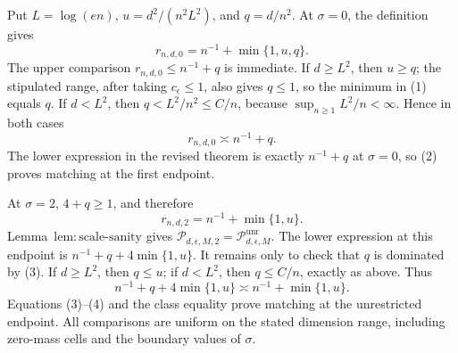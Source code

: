 Put \(L=\log(en)\), \(u=d^2/(n^2L^2)\), and \(q=d/n^2\).  At \(\sigma=0\), the definition gives
\[
 r_{n,d,0}=n^{-1}+\min\{1,u,q\}.
\tag{1}
\]
The upper comparison \(r_{n,d,0}\le n^{-1}+q\) is immediate.  If \(d\ge L^2\), then \(u\ge q\); the stipulated range, after taking \(c_{\epsilon}\le1\), also gives \(q\le1\), so the minimum in (1) equals \(q\).  If \(d<L^2\), then \(q<L^2/n^2\le C/n\), because \(\sup_{n\ge1}L^2/n<\infty\).  Hence in both cases
\[
 r_{n,d,0}\asymp n^{-1}+q.
\tag{2}
\]
The lower expression in the revised theorem is exactly \(n^{-1}+q\) at \(\sigma=0\), so (2) proves matching at the first endpoint.

At \(\sigma=2\), \(4+q\ge1\), and therefore
\[
 r_{n,d,2}=n^{-1}+\min\{1,u\}.
\tag{3}
\]
Lemma~\(\mathrm{lem:scale\text{-}sanity}\) gives \(\mathcal P_{d,\epsilon,M,2}=\mathcal P_{d,\epsilon,M}^{\mathrm{unr}}\).  The lower expression at this endpoint is \(n^{-1}+q+4\min\{1,u\}\).  It remains only to check that \(q\) is dominated by (3).  If \(d\ge L^2\), then \(q\le u\); if \(d<L^2\), then \(q\le C/n\), exactly as above.  Thus
\[
 n^{-1}+q+4\min\{1,u\}\asymp n^{-1}+\min\{1,u\}.
\tag{4}
\]
Equations (3)--(4) and the class equality prove matching at the unrestricted endpoint.  All comparisons are uniform on the stated dimension range, including zero-mass cells and the boundary values of \(\sigma\).